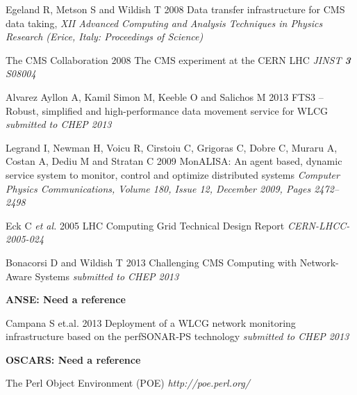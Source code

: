 \begin{thebibliography}{1}

 Egeland R, Metson S and Wildish T 2008 Data transfer infrastructure for CMS data taking,  {\it XII Advanced Computing and Analysis Techniques in Physics Research (Erice, Italy: Proceedings of Science)}

 The CMS Collaboration 2008 The CMS experiment at the CERN LHC {\it JINST {\bf 3} S08004}

 Alvarez Ayllon A, Kamil Simon M, Keeble O and Salichos M 2013 FTS3 – Robust, simplified and high-performance data movement service for WLCG {\it submitted to CHEP 2013}

 Legrand I, Newman H, Voicu R, Cirstoiu C, Grigoras C, Dobre C, Muraru A, Costan A, Dediu M and Stratan C 2009 MonALISA: An agent based, dynamic service system to monitor, control and optimize distributed systems {\it Computer Physics Communications, Volume 180, Issue 12, December 2009, Pages 2472–2498}

 Eck C {\it et al.} 2005 LHC Computing Grid Technical Design Report {\it CERN-LHCC-2005-024}

 Bonacorsi D and Wildish T 2013 Challenging CMS Computing with Network-Aware Systems {\it submitted to CHEP 2013}

 \textbf{ANSE: Need a reference}

  Campana S et.al. 2013 Deployment of a WLCG network monitoring infrastructure based on the perfSONAR-PS technology {\it submitted to CHEP 2013}

 \textbf{OSCARS: Need a reference}

 The Perl Object Environment (POE) {\it http://poe.perl.org/}


\end{thebibliography}
